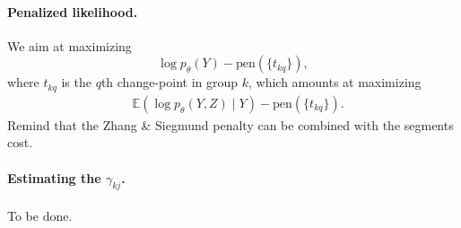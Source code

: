 \documentclass[a4paper, 11pt]{article}
\newcommand{\Esp}{\mathbb{E}}
\begin{document}
\paragraph{Penalized likelihood.}
We aim at maximizing
$$
\log p_\theta(Y) - \text{pen}(\{t_{kq}\}),
$$
where $t_{kq}$ is the $q$th change-point in group $k$, which amounts at maximizing
\begin{align*}
 & \Esp \left(\log p_\theta(Y, Z)  \mid Y\right) - \text{pen}(\{t_{kq}\}).
\end{align*}
Remind that the Zhang \& Siegmund penalty can be combined with the segments cost.

\paragraph{Estimating the $\gamma_{kj}$.} To be done.
\end{document}
